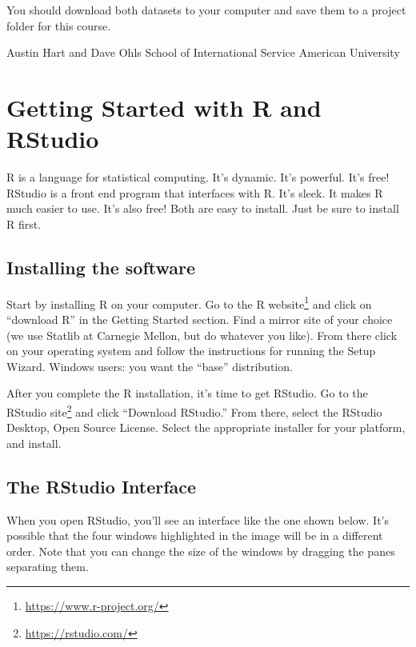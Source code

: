 \documentclass[
  12pt,
]{krantz}
\renewcommand{\href}[2]{#2\footnote{\url{#1}}}
\begin{document}
You should download both datasets to your computer and save them to a project folder for this course.

\begin{flushright}
Austin Hart and Dave Ohls
School of International Service
American University
\end{flushright}

\mainmatter

\hypertarget{getting-started-with-r-and-rstudio}{%
\chapter{Getting Started with R and RStudio}\label{getting-started-with-r-and-rstudio}}

R is a language for statistical computing. It's dynamic. It's powerful. It's free! RStudio is a front end program that interfaces with R. It's sleek. It makes R much easier to use. It's also free! Both are easy to install. Just be sure to install R first.

\hypertarget{installing-the-software}{%
\section{Installing the software}\label{installing-the-software}}

Start by installing R on your computer. \href{https://www.r-project.org/}{Go to the R website} and click on ``download R'' in the Getting Started section. Find a mirror site of your choice (we use Statlib at Carnegie Mellon, but do whatever you like). From there click on your operating system and follow the instructions for running the Setup Wizard. Windows users: you want the ``base'' distribution.

After you complete the R installation, it's time to get RStudio. \href{https://rstudio.com/}{Go to the RStudio site} and click ``Download RStudio.'' From there, select the RStudio Desktop, Open Source License. Select the appropriate installer for your platform, and install.

\hypertarget{the-rstudio-interface}{%
\section{The RStudio Interface}\label{the-rstudio-interface}}

When you open RStudio, you'll see an interface like the one shown below. It's possible that the four windows highlighted in the image will be in a different order. Note that you can change the size of the windows by dragging the panes separating them.
\end{document}
